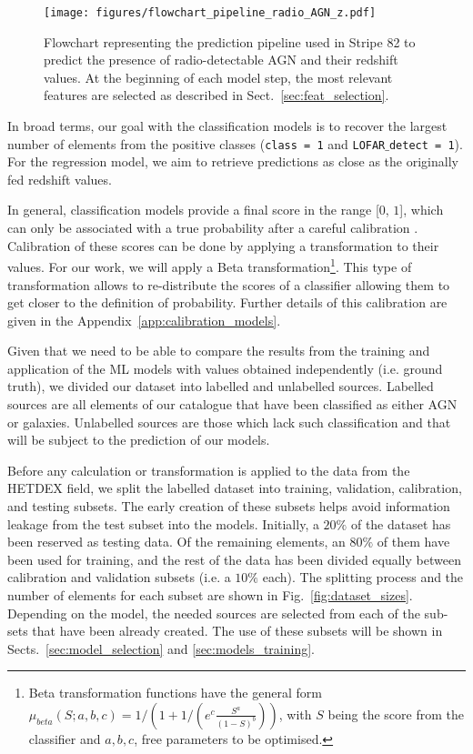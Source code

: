 \documentclass{aa}
\begin{document}
\begin{figure}
   \centering
   \texttt{[image: figures/flowchart\_pipeline\_radio\_AGN\_z.pdf]}
   \caption{Flowchart representing the prediction pipeline used in Stripe 82 to predict the presence of radio-detectable AGN and their redshift values. At the beginning of each model step, the most relevant features are selected as described in Sect.~\ref{sec:feat_selection}.}
   \label{fig:pipeline_flowchart}
\end{figure}

In broad terms, our goal with the classification models is to recover the largest number of elements from the positive classes (\texttt{class = 1} and \texttt{LOFAR$\_$detect = 1}). For the regression model, we aim to retrieve predictions as close as the originally fed redshift values.

In general, classification models provide a final score in the range [$0$, $1$], which can only be associated with a true probability after a careful calibration  \citep{10.1214/17-EJS1338SI, pmlr-v54-kull17a}. Calibration of these scores can be done by applying a transformation to their values. For our work, we will apply a Beta transformation\footnote{Beta transformation functions have the general form $\mu_{beta}(S;a,b,c) = 1/\left(1 + 1 / \left(e^{c} \frac{S^{a}}{(1 - S)^{b}}\right)\right)$, with $S$ being the score from the classifier and $a,b,c$, free parameters to be optimised.}. This type of transformation allows to re-distribute the scores of a classifier allowing them to get closer to the definition of probability. Further details of this calibration are given in the Appendix~\ref{app:calibration_models}.

Given that we need to be able to compare the results from the training and application of the ML models with values obtained independently (i.e. ground truth), we divided our dataset into labelled and unlabelled sources. Labelled sources are all elements of our catalogue that have been classified as either AGN or galaxies. Unlabelled sources are those which lack such classification and that will be subject to the prediction of our models.  

Before any calculation or transformation is applied to the data from the HETDEX field, we split the labelled dataset into training, validation, calibration, and testing subsets. The early creation of these subsets helps avoid information leakage from the test subset into the models. Initially, a $20 \%$ of the dataset has been reserved as testing data. Of the remaining elements, an $80 \%$ of them have been used for training, and the rest of the data has been divided equally between calibration and validation subsets (i.e. a $10 \%$ each). The splitting process and the number of elements for each subset are shown in Fig.~\ref{fig:dataset_sizes}. Depending on the model, the needed sources are selected from each of the sub-sets that have been already created. The use of these subsets will be shown in Sects.~\ref{sec:model_selection} and \ref{sec:models_training}. 
\end{document}
